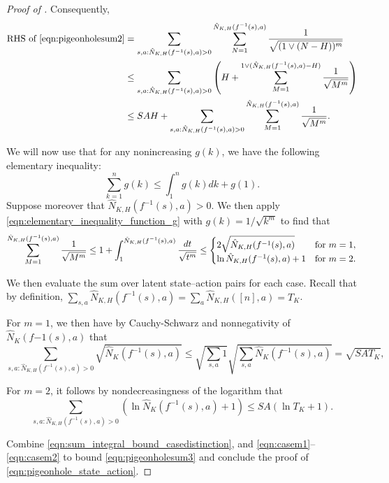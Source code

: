 \documentclass[11pt]{article}
\newcommand{\lb}{\left(}
\newcommand{\rb}{\right)}
\theoremstyle{definition}
\theoremstyle{definition}
\begin{document}
\begin{proof}[Proof of ]
	Consequently,
	\begin{equation}\label{eqn:pigeonholesum3}
		\begin{split}
			\textnormal{RHS of } \eqref{eqn:pigeonholesum2}
			 &
			= \sum_{s,a:\hat{N}_{K,H}(f^{-1}(s),a)>0}\sum_{N=1}^{\hat{N}_{K,H}(f^{-1}(s),a)}\frac{1}{\sqrt{(1\vee(N-H))^m}}\\
			 &
			\leq
			\sum_{s,a:\hat{N}_{K,H}(f^{-1}(s),a)>0}\lb H + \sum_{M=1}^{1\vee(\hat{N}_{K,H}(f^{-1}(s),a)-H)}\frac{1}{\sqrt{M^m}} \rb\\
			 &
			\leq
			SAH + \sum_{s,a:\hat{N}_{K,H}(f^{-1}(s),a)>0}\sum_{M=1}^{\hat{N}_{K,H}(f^{-1}(s),a)}\frac{1}{\sqrt{M^m}}.
		\end{split}
	\end{equation}

	We will now use that for any nonincreasing $g(k)$, we have the following elementary inequality:
	\begin{equation}
		\label{eqn:elementary_inequality_function_g}
		\sum_{k=1}^n
		g(k)\leq \int_1^ng(k)dk+g(1).
	\end{equation}
	Suppose moreover that $\hat{N}_{K,H}(f^{-1}(s),a)>0$.
	We then apply \eqref{eqn:elementary_inequality_function_g} with $g(k)=1/\sqrt{k^m}$ to find that
	\begin{equation}
		\label{eqn:sum_integral_bound_casedistinction}
		\sum_{M=1}^{\hat{N}_{K,H}(f^{-1}(s),a)}
		\frac{1}{\sqrt{M^m}}
		\leq
		1+
		\int_1^{\hat{N}_{K,H}(f^{-1}(s),a)}
		\frac{dt}{\sqrt{t^m}}
		\leq
		\begin{cases}
			2\sqrt{\hat{N}_{K,H}(f^{-1}(s),a)}
			 &
			\textnormal{for }m=1, \\
			\ln \hat{N}_{K,H}(f^{-1}(s),a)+1
			 &
			\textnormal{for }m=2.
		\end{cases}
	\end{equation}

	We then evaluate the sum over latent state--action pairs for each case.
	Recall that by definition, $\sum_{s,a}\hat{N}_{K,H}(f^{-1}(s),a)=\sum_{a}\hat{N}_{K,H}([n],a)=T_K$.

	For $m=1$, we then have by Cauchy-Schwarz and nonnegativity of $\hat{N}_K(f{-1}(s),a)$ that
	\begin{equation}\label{eqn:casem1}
		\sum_{s,a:\hat{N}_{K,H}(f^{-1}(s),a)>0}\sqrt{\hat{N}_{K}(f^{-1}(s),a)}
		\leq
		\sqrt{\sum_{s,a} 1}\sqrt{\sum_{s,a}\hat{N}_{K}(f^{-1}(s),a)}
		=
		\sqrt{SAT_K},
	\end{equation}

	For $m=2$, it follows by nondecreasingness of the logarithm that
	\begin{equation}\label{eqn:casem2}
		\sum_{s,a:\hat{N}_{K,H}(f^{-1}(s),a)>0}\lb \ln \hat{N}_{K}(f^{-1}(s),a) +1\rb \leq SA\lb \ln T_K +1\rb
		.
	\end{equation}

	Combine \eqref{eqn:sum_integral_bound_casedistinction}, and \eqref{eqn:casem1}--\eqref{eqn:casem2} to bound \eqref{eqn:pigeonholesum3} and conclude the proof of \eqref{eqn:pigeonhole_state_action}.
\end{proof}


\newpage
\end{document}
